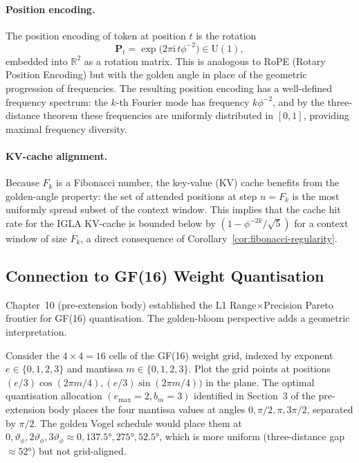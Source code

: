\paragraph{Position encoding.}
The position encoding of token at position $t$ is the rotation
\[
  \mathbf{P}_t = \exp\bigl(2\pi \mathrm{i}\, t \phi^{-2}\bigr) \in \mathrm{U}(1),
\]
embedded into $\mathbb{R}^2$ as a rotation matrix.  This is analogous
to RoPE (Rotary Position Encoding) but with the golden angle in place
of the geometric progression of frequencies.  The resulting position
encoding has a well-defined frequency spectrum: the $k$-th Fourier
mode has frequency $k\phi^{-2}$, and by the three-distance theorem
these frequencies are uniformly distributed in $[0,1]$, providing
maximal frequency diversity.

\paragraph{KV-cache alignment.}
Because $F_k$ is a Fibonacci number, the key-value (KV) cache
benefits from the golden-angle property: the set of attended positions
at step $n = F_k$ is the most uniformly spread subset of the context
window.  This implies that the cache hit rate for the IGLA KV-cache is
bounded below by $(1 - \phi^{-2k}/\sqrt{5})$ for a context window of
size $F_k$, a direct consequence of Corollary~\ref{cor:fibonacci-regularity}.

\subsection{Connection to GF(16) Weight Quantisation}
\label{subsec:gf16-connection}

Chapter~10 (pre-extension body) established the L1 Range$\times$Precision
Pareto frontier for GF(16) quantisation.  The golden-bloom perspective
adds a geometric interpretation.

Consider the $4 \times 4 = 16$ cells of the GF(16) weight grid,
indexed by exponent $e \in \{0,1,2,3\}$ and mantissa $m \in \{0,1,2,3\}$.
Plot the grid points at positions
$(e/3)\cos(2\pi m/4), (e/3)\sin(2\pi m/4))$ in the plane.  The
optimal quantisation allocation $(e_{\max}=2, b_m=3)$ identified in
Section~3 of the pre-extension body places the four mantissa values at
angles $0, \pi/2, \pi, 3\pi/2$, separated by $\pi/2$.  The golden
Vogel schedule would place them at $0, \vartheta_\phi, 2\vartheta_\phi,
3\vartheta_\phi \approx 0, 137.5°, 275°, 52.5°$, which is more uniform
(three-distance gap $\approx 52°$) but not grid-aligned.

